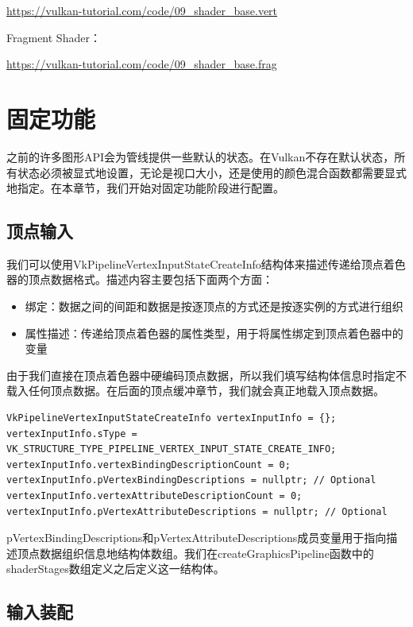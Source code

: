 \documentclass{ctexart}
\begin{document}
\url{https://vulkan-tutorial.com/code/09_shader_base.vert}

Fragment Shader：

\url{https://vulkan-tutorial.com/code/09_shader_base.frag}

\newpage
\section{固定功能}

之前的许多图形API会为管线提供一些默认的状态。在Vulkan不存在默认状态，所有状态必须被显式地设置，无论是视口大小，还是使用的颜色混合函数都需要显式地指定。在本章节，我们开始对固定功能阶段进行配置。

\subsection{顶点输入}

我们可以使用VkPipelineVertexInputStateCreateInfo结构体来描述传递给顶点着色器的顶点数据格式。描述内容主要包括下面两个方面：

\begin{itemize}
	\item 绑定：数据之间的间距和数据是按逐顶点的方式还是按逐实例的方式进行组织
	\item 属性描述：传递给顶点着色器的属性类型，用于将属性绑定到顶点着色器中的变量
\end{itemize}

由于我们直接在顶点着色器中硬编码顶点数据，所以我们填写结构体信息时指定不载入任何顶点数据。在后面的顶点缓冲章节，我们就会真正地载入顶点数据。

\begin{lstlisting}[language={[ANSI]C}]
VkPipelineVertexInputStateCreateInfo vertexInputInfo = {};
vertexInputInfo.sType = VK_STRUCTURE_TYPE_PIPELINE_VERTEX_INPUT_STATE_CREATE_INFO;
vertexInputInfo.vertexBindingDescriptionCount = 0;
vertexInputInfo.pVertexBindingDescriptions = nullptr; // Optional
vertexInputInfo.vertexAttributeDescriptionCount = 0;
vertexInputInfo.pVertexAttributeDescriptions = nullptr; // Optional
\end{lstlisting}

pVertexBindingDescriptions和pVertexAttributeDescriptions成员变量用于指向描述顶点数据组织信息地结构体数组。我们在createGraphicsPipeline函数中的shaderStages数组定义之后定义这一结构体。

\subsection{输入装配}
\end{document}
